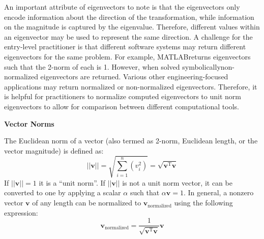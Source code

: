 \documentclass[12pt,letter]{article}
\begin{document}
An important attribute of eigenvectors to note is that the eigenvectors only encode information about the direction of the transformation, while information on the magnitude is captured by the eigenvalue. Therefore, different values within an eigenvector may be used to represent the same direction.  A challenge for the entry-level practitioner is that different software systems may return different eigenvectors for the same problem. For example, MATLAB\protect\footnotemark[1] returns eigenvectors such that the 2-norm of each is 1. However, when solved symbolically\protect\footnotemark[2] non-normalized eigenvectors are returned. Various other engineering-focused applications may return normalized or non-normalized eigenvectors\protect\footnotemark[3]. Therefore, it is helpful for practitioners to normalize computed eigenvectors to unit norm eigenvectors to allow for comparison between different computational tools. 




 \begin{review} 
 \textbf{Vector Norms} 
 
\noindent The Euclidean norm of a vector (also termed as 2-norm, Euclidean length, or the vector magnitude) is defined as:
\begin{equation}
||\textbf{v}|| = \sqrt{\sum_{i=1}^{n}(v_i^2)} = \sqrt{\textbf{v}^{\text{T}}\textbf{v}}
\end{equation} 
If $||\textbf{v}|| = 1$ it is a ``unit norm''. If $||\textbf{v}||$ is not a unit norm vector, it can be converted to one by applying a scalar $\alpha$ such that $\alpha\textbf{v}=1$. In general, a nonzero vector $\textbf{v}$ of any length can be normalized to $\textbf{v}_\text{normalized}$ using the following expression:
 \begin{equation}
 \textbf{v}_\text{normalized} = \frac{1}{\sqrt{\textbf{v}^{\text{T}}\textbf{v}} } \textbf{v}
 \end{equation}
\end{review} 







 
\end{document}
